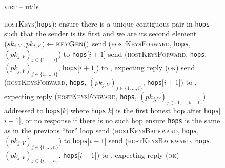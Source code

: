 \begin{figure}[H]
  \begin{processbox}{\textsc{virt} -- utils}
    \begin{algorithmic}[1]
      \State \textsc{hostKeys}(\texttt{hops}): 
      \Indent
         
            \State ensure there is a unique contiguous pair in \texttt{hops}
            such that the sender is its first and we are its second element
          \EndIf
          \State $(sk_{i, V}, pk_{i, V}) \gets \textsc{keyGen}()$
            \State send (\textsc{hostKeysForward}, \texttt{hops}, $(pk_{j, V})_{j
            \in \{1, \dots, i\}}$) to \texttt{hops}[$i+1$]
          \Else {}
              \State send (\textsc{hostKeysForward}, \texttt{hops}, $(pk_{j,
              V})_{j \in \{1, \dots, i\}}$, \texttt{hops}[$i+1$]) to \adversary,
              expecting reply (\textsc{ok})
            \Else {}
              \State send (\textsc{hostKeysForward}, \texttt{hops}, $(pk_{j,
              V})_{j \in \{1, \dots, i\}}$, \texttt{hops}[$i+1$]) to \adversary,
              expecting reply (\textsc{hostKeysForward}, \texttt{hops}, $(pk_{j,
              V})_{j \in \{1, \dots, k-1\}}$) addressed to \texttt{hops}[$k$]
              where \texttt{hops}[$k$] is the first honest hop after
              \texttt{hops}[$i+1$], or no response if there is no such hop
            \EndIf
          \EndIf
        \EndFor {}
         
            \State ensure \texttt{hops} is the same as in the previous ``for''
            loop
          \EndIf
            \State send (\textsc{hostKeysBackward}, \texttt{hops}, $(pk_{j,
            V})_{j \in \{i, \dots, n\}}$) to \texttt{hops}[$i-1$]
          \Else {}
              \State send (\textsc{hostKeysBackward}, \texttt{hops}, $(pk_{j,
              V})_{j \in \{i, \dots, n\}}$, \texttt{hops}[$i-1$]) to \adversary,
              expecting reply (\textsc{ok})
            \Else {}

\end{algorithmic}
\end{processbox}
\end{figure}
